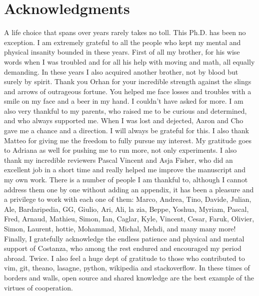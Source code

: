 \chapter*{Acknowledgments}

A life choice that spans over years rarely takes no toll. This Ph.D. has been
no exception. I am extremely grateful to all the people who kept my mental and
physical insanity bounded in these years. First of all my brother, for his wise
words when I was troubled and for all his help with moving and math, all
equally demanding. In these years I also acquired another brother, not by blood
but surely by spirit. Thank you Orhan for your incredible strength against the
slings and arrows of outrageous fortune. You helped me face losses and troubles
with a smile on my face and a beer in my hand. I couldn't have asked for more.
I am also very thankful to my parents, who raised me to be curious and
determined, and who always supported me. When I was lost and dejected, Aaron
and Cho gave me a chance and a direction. I will always be grateful for this. I
also thank Matteo for giving me the freedom to fully pursue my interest. My
gratitude goes to Adriana as well for pushing me to run more, not only
experiments. I also thank my incredible reviewers Pascal Vincent and Asja
Fisher, who did an excellent job in a short time and really helped me improve
the manuscript and my own work. There is a number of people I am thankful to,
although I cannot address them one by one without adding an appendix, it has
been a pleasure and a privilege to work with each one of them: Marco, Andrea,
Tino, Davide, Julian, Ale, Bardaripedia\textsuperscript{\textregistered}, GG,
Giulio, Ari, Ali, la zia, Beppe, Yoshua, Myriam, Pascal, Fred, Arnaud, Mathieu,
Simon, Ian, Caglar, Kyle, Vincent, Cesar, Faruk, Olivier, Simon, Laurent,
hottie, Mohammad, Michal, Mehdi, and many many more! Finally, I gratefully
acknowledge the endless patience and physical and mental support of Costanza,
who among the rest endured and encouraged my period abroad. Twice.  I also feel
a huge dept of gratitude to those who contributed to vim, git, theano, lasagne,
python, wikipedia and stackoverflow. In these times of borders and walls, open
source and shared knowledge are the best example of the virtues of cooperation.

